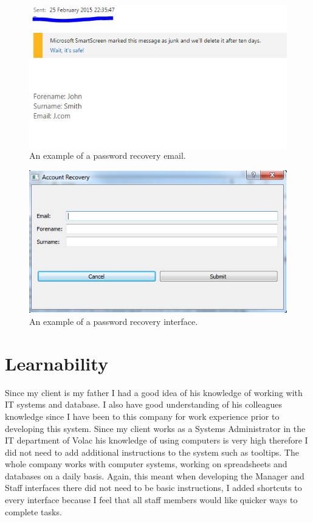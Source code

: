 \begin{figure}[H]
    \includegraphics[width=\textwidth]{./Testing/Images/ForgotPasswordValidationEmail.png}
    \caption{An example of a password recovery email.} 
\end{figure}

\begin{figure}[H]
    \includegraphics[width=\textwidth]{./Testing/Images/ForgotPassword.png}
    \caption{An example of a password recovery interface.} 
\end{figure}


\section{Learnability}

Since my client is my father I had a good idea of his knowledge of working with IT systems and database. I also have good understanding of his colleagues knowledge since I have been to this company for work experience prior to developing this system. Since my client works as a Systems Administrator in the IT department of Volac his knowledge of using computers is very high therefore I did not need to add additional instructions to the system such as tooltips. The whole company works with computer systems, working on spreadsheets and databases on a daily basis. Again, this meant when developing the Manager and Staff interfaces there did not need to be basic instructions, I added shortcuts to every interface because I feel that all staff members would like quicker ways to complete tasks.

